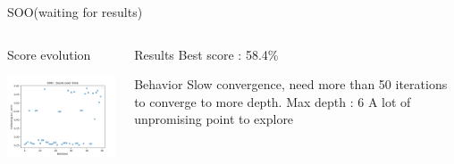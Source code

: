 \begin{frame}[allowframebreaks]{SOO(waiting for results)}
    
    \begin{columns}
    
        \begin{column}[t]{0.6\textwidth}
            \begin{block}{Score evolution}
                
                \includegraphics[width = 7.5cm]{imgs/plots/exp10_score_over_time.png}
            
            \end{block}   
        \end{column}

        \begin{column}[t]{0.4\textwidth}
            \begin{block}{Results}
                Best score : 58.4\%\\              
            \end{block}

            \begin{block}{Behavior}
                Slow convergence, need more than 50 iterations to converge to more depth. 
                Max depth : 6
                A lot of unpromising point to explore
                
            \end{block}
            
            
        \end{column}
    \end{columns}   
    
    \framebreak

    \begin{columns}
    

\end{columns}
\end{frame}

